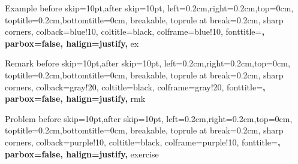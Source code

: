 \newtheorem{thm}{Theorem}[chapter]
\newtheorem{cor}[thm]{Corollary}
\newtheorem{lem}[thm]{Lemma}
\newtheorem{fct}[thm]{Fact}

\theoremstyle{definition}
\newtheorem{defn}[thm]{Definition}



\def\b{\textcolor{blue}}
\def\r{\textcolor{red}}
\def\g{\textcolor{green}}
\def\purple{\textcolor{purple}}

\usepackage{xcolor,amsmath}
\usepackage[linesnumbered,ruled,vlined,algochapter]{algorithm2e}
\DontPrintSemicolon
\makeatletter
    \let\c@algocf\c@thm
\makeatother
{}

\renewcommand{\KwSty}[1]{\textnormal{\textcolor{blue!90!black}{\ttfamily\bfseries #1}}\unskip}
\renewcommand{\ArgSty}[1]{\textnormal{\ttfamily #1}\unskip}
\renewcommand{\CommentSty}[1]{\textnormal{\ttfamily\color{green!50!black}#1}\unskip}
\newcommand{\assign}{\leftarrow}
\newcommand{\var}{\texttt}
\newcommand{\FuncCall}[2]{\texttt{\bfseries #1(#2)}}
\renewcommand{\ProgSty}[1]{\texttt{\bfseries #1}}

  {Example}
  {%
    before skip=10pt,after skip=10pt,
    left=0.2cm,right=0.2cm,top=0cm,
    toptitle=0.2cm,bottomtitle=0cm,
    breakable,
    toprule at break=0.2cm,
    sharp corners,
    colback=blue!10,
    coltitle=black,
    colframe=blue!10,
    fonttitle=\bfseries,
    parbox=false,
    halign=justify, %
  }%
  {ex}%

  {Remark}
  {%
    before skip=10pt,after skip=10pt,
    left=0.2cm,right=0.2cm,top=0cm,
    toptitle=0.2cm,bottomtitle=0cm,
    breakable,
    toprule at break=0.2cm,
    sharp corners,
    colback=gray!20,
    coltitle=black,
    colframe=gray!20,
    fonttitle=\bfseries,
    parbox=false,
    halign=justify,
  }%
  {rmk}%

  {Problem}
  {%
    before skip=10pt,after skip=10pt,
    left=0.2cm,right=0.2cm,top=0cm,
    toptitle=0.2cm,bottomtitle=0cm,
    breakable,
    toprule at break=0.2cm,
    sharp corners,
    colback=purple!10,
    coltitle=black,
    colframe=purple!10,
    fonttitle=\bfseries,
    parbox=false,
    halign=justify,
  }%
  {exercise}%

